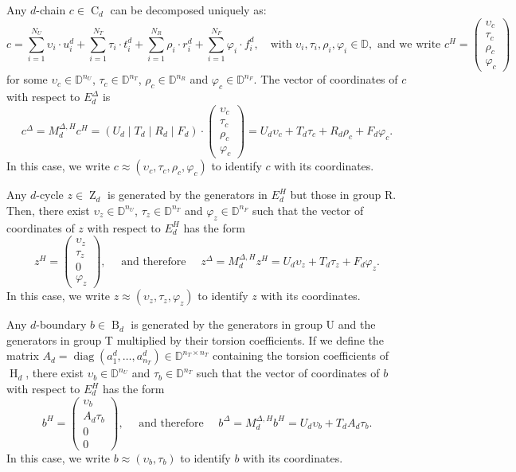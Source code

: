 \documentclass[a4paper,10pt]{article}
\newcommand{\bbd}{\mathbb{D}}
\newcommand{\E}{E^\Delta}
\newcommand{\mdh}{M^{\Delta,H}}
\DeclareMathOperator{\Co}{C}
\DeclareMathOperator{\Zo}{Z}
\DeclareMathOperator{\Bo}{B}
\DeclareMathOperator{\Ho}{H}
\begin{document}
Any \(d\)-chain \(c \in \Co_d\) can be decomposed uniquely as: 
\[
c = \sum_{i=1}^{N_U} \upsilon_i \cdot u^{d}_{i}
+\sum_{i=1}^{N_T} \tau_i \cdot t^{d}_{i}
+\sum_{i=1}^{N_R} \rho_i  \cdot r^{d}_{i}
+\sum_{i=1}^{N_F} \varphi_i  \cdot f^{d}_{i}, \quad \text{with} \; \upsilon_i, \tau_i, \rho_i, \varphi_i \in \bbd, \text{ and we write }
c^H = 
\left(
\begin{array}{c}
\upsilon_c \\ \tau_c \\ \rho_c \\ \varphi_c
\end{array}
\right)
\]
for some \(\upsilon_c \in \bbd^{n_U}\), \(\tau_c \in \bbd^{n_T}\), \(\rho_c \in \bbd^{n_R}\) and \(\varphi_c \in \bbd^{n_F}\). The vector of coordinates of \(c\) with respect to \(\E_d\) is 
\[
c^{\Delta}=\mdh_d c^{H} =
\left( U_d \mid T_d \mid R_d \mid F_d \right) \cdot
\left(
\begin{array}{c}
\upsilon_c \\ \tau_c \\ \rho_c \\ \varphi_c
\end{array}
\right) = U_d \upsilon_c + T_d \tau_c + R_d \rho_c + F_d \varphi_c.
\]
In this case, we write \(c \approx(\upsilon_c , \tau_c , \rho_c , \varphi_c)\) to identify \(c\) with its coordinates.

Any \(d\)-cycle \(z \in \Zo_d\) is generated by the generators in \(E^H_d\) but those in group R. Then, there exist \(\upsilon_z \in \bbd^{n_U}\), \(\tau_z \in \bbd^{n_T}\) and \(\varphi_z \in \bbd^{n_F}\) such that the vector of coordinates of \(z\) with respect to \(E^{H}_d\) has the form 
\[
z^H=
\left(
\begin{array}{c}
\upsilon_z \\ \tau_z \\ 0 \\ \varphi_z
\end{array}
\right),
\quad \text{ and therefore } \quad
z^{\Delta}=\mdh_d z^{H} = U_d \upsilon_z + T_d \tau_z + F_d \varphi_z.
\]
In this case, we write \(z \approx(\upsilon_z , \tau_z, \varphi_z)\) to identify \(z\) with its coordinates.

Any \(d\)-boundary \(b \in \Bo_d\) is generated by the generators in group U and the generators in group T multiplied by their torsion coefficients. If we define the matrix \(A_d = \operatorname{diag}(a^{d}_{1},\ldots,a^{d}_{n_T}) \in \bbd^{n_T \times n_T}\) containing the torsion coefficients of \(\Ho_d\), there exist \(\upsilon_b \in \bbd^{n_U}\) and \(\tau_b \in \bbd^{n_T}\) such that the vector of coordinates of \(b\) with respect to \(E^H_d\) has the form 
\[
b^H =
\left(
\begin{array}{c}
\upsilon_b \\ A_d \tau_b \\ 0 \\ 0
\end{array}
\right),
\quad \text{ and therefore } \quad
b^{\Delta} = \mdh_d b^H = U_d \upsilon_b + T_dA_d \tau_b.
\]
In this case, we write \(b \approx(\upsilon_b , \tau_b)\) to identify \(b\) with its coordinates.
\end{document}
